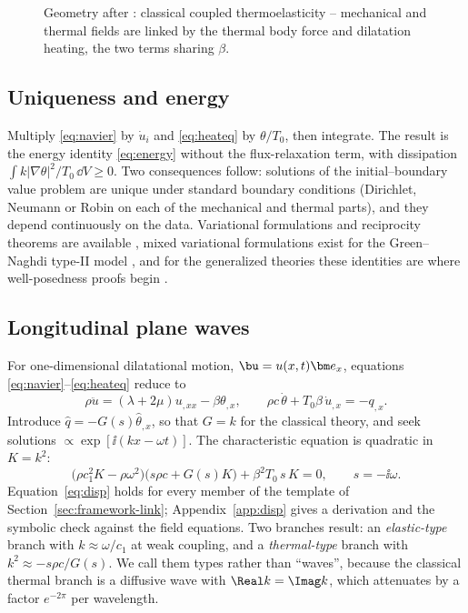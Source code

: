 \begin{figure}[t!]\centering\small

\caption{Geometry after \citep{Biot1956}: classical coupled thermoelasticity -- mechanical and thermal fields are linked by the thermal body force and dilatation heating, the two terms sharing $\beta$.}\label{fig:classical-coup}
\end{figure}

\subsection{Uniqueness and energy}
Multiply \eqref{eq:navier} by $\dot u_i$ and \eqref{eq:heateq} by $\theta/T_0$, then integrate. The result is the energy identity \eqref{eq:energy} without the flux-relaxation term, with dissipation $\int k|\nabla\theta|^2/T_0\,\dd V\ge0$. Two consequences follow: solutions of the initial--boundary value problem are unique under standard boundary conditions (Dirichlet, Neumann or Robin on each of the mechanical and thermal parts), and they depend continuously on the data. Variational formulations and reciprocity theorems are available \citep{Carlson1972,Nowacki1975}, mixed variational formulations exist for the Green--Naghdi type-II model \citep{Marotti2013}, and for the generalized theories these identities are where well-posedness proofs begin \citep{Chandrasekharaiah1996,Quintanilla2019}.

\subsection{Longitudinal plane waves}\label{sec:longitudinal}
For one-dimensional dilatational motion, $\bu=u(x,t)\bm e_x$, equations \eqref{eq:navier}--\eqref{eq:heateq} reduce to
\begin{equation}
\rho\ddot u=(\lambda+2\mu)u_{,xx}-\beta\theta_{,x},\qquad \rho c\,\dot\theta+T_0\beta\,\dot u_{,x}=-q_{,x}.\label{eq:1d}
\end{equation}
Introduce $\hat q=-G(s)\hat\theta_{,x}$, so that $G=k$ for the classical theory, and seek solutions $\propto\exp[\ii(kx-\omega t)]$. The characteristic equation is quadratic in $K=k^2$:
\begin{equation}
\bigl(\rho c_1^2K-\rho\omega^2\bigr)\bigl(s\rho c+G(s)K\bigr)+\beta^2T_0\,s\,K=0,\qquad s=-\ii\omega. \label{eq:disp}
\end{equation}
Equation~\eqref{eq:disp} holds for every member of the template of Section~\ref{sec:framework-link}; Appendix~\ref{app:disp} gives a derivation and the symbolic check against the field equations. Two branches result: an \emph{elastic-type} branch with $k\approx\omega/c_1$ at weak coupling, and a \emph{thermal-type} branch with $k^2\approx-s\rho c/G(s)$. We call them types rather than ``waves'', because the classical thermal branch is a diffusive wave with $\Real k=\Imag k$, which attenuates by a factor $e^{-2\pi}$ per wavelength.

